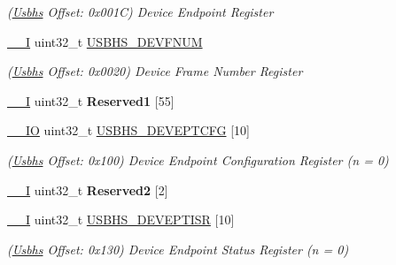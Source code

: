 \begin{DoxyCompactItemize}
\begin{DoxyCompactList}\small\item\em (\mbox{\hyperlink{structUsbhs}{Usbhs}} Offset\+: 0x001C) Device Endpoint Register \end{DoxyCompactList}\item 
\mbox{\label{structUsbhs_a0df7ec1fd84f99453fe549f6b1b9717b}} 
\mbox{\hyperlink{core__cm7_8h_af63697ed9952cc71e1225efe205f6cd3}{\+\_\+\+\_\+I}} uint32\+\_\+t \mbox{\hyperlink{structUsbhs_a0df7ec1fd84f99453fe549f6b1b9717b}{U\+S\+B\+H\+S\+\_\+\+D\+E\+V\+F\+N\+UM}}
\begin{DoxyCompactList}\small\item\em (\mbox{\hyperlink{structUsbhs}{Usbhs}} Offset\+: 0x0020) Device Frame Number Register \end{DoxyCompactList}\item 
\mbox{\label{structUsbhs_aa2826a3a1189fa4463606376849de96d}} 
\mbox{\hyperlink{core__cm7_8h_af63697ed9952cc71e1225efe205f6cd3}{\+\_\+\+\_\+I}} uint32\+\_\+t {\bfseries Reserved1} \mbox{[}55\mbox{]}
\item 
\mbox{\label{structUsbhs_a7cf0b2333d3d036bf0f236ea168fbb23}} 
\mbox{\hyperlink{core__cm7_8h_aec43007d9998a0a0e01faede4133d6be}{\+\_\+\+\_\+\+IO}} uint32\+\_\+t \mbox{\hyperlink{structUsbhs_a7cf0b2333d3d036bf0f236ea168fbb23}{U\+S\+B\+H\+S\+\_\+\+D\+E\+V\+E\+P\+T\+C\+FG}} \mbox{[}10\mbox{]}
\begin{DoxyCompactList}\small\item\em (\mbox{\hyperlink{structUsbhs}{Usbhs}} Offset\+: 0x100) Device Endpoint Configuration Register (n = 0) \end{DoxyCompactList}\item 
\mbox{\label{structUsbhs_a7b9af5303fb9ef093c45af420c51e122}} 
\mbox{\hyperlink{core__cm7_8h_af63697ed9952cc71e1225efe205f6cd3}{\+\_\+\+\_\+I}} uint32\+\_\+t {\bfseries Reserved2} \mbox{[}2\mbox{]}
\item 
\mbox{\label{structUsbhs_a8682f1658eea35837b89f904ba197df4}} 
\mbox{\hyperlink{core__cm7_8h_af63697ed9952cc71e1225efe205f6cd3}{\+\_\+\+\_\+I}} uint32\+\_\+t \mbox{\hyperlink{structUsbhs_a8682f1658eea35837b89f904ba197df4}{U\+S\+B\+H\+S\+\_\+\+D\+E\+V\+E\+P\+T\+I\+SR}} \mbox{[}10\mbox{]}
\begin{DoxyCompactList}\small\item\em (\mbox{\hyperlink{structUsbhs}{Usbhs}} Offset\+: 0x130) Device Endpoint Status Register (n = 0) \end{DoxyCompactList}\item 

\end{DoxyCompactItemize}
